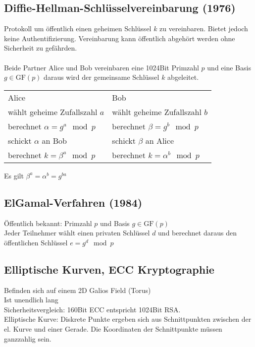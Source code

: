 \documentclass[fs]{latex4ei}
\newcommand{\GF}{\ensuremath{\mathrm{GF}}}									%
\begin{document}
\begin{multicols}{4}
		\subsection{Diffie-Hellman-Schlüsselvereinbarung (1976)}
		Protokoll um öffentlich einen geheimen Schlüssel $k$ zu vereinbaren. Bietet jedoch keine Authentifizierung.
		Vereinbarung kann öffentlich abgehört werden ohne Sicherheit zu gefährden.\\
		\\
		Beide Partner Alice und Bob vereinbaren eine 1024Bit Primzahl $p$ und eine Basis $g \in \GF(p)$ daraus wird der gemeinsame Schlüssel $k$ abgeleitet.\\
		\begin{tabular}{l|l}
			Alice & Bob\\
			wählt geheime Zufallszahl $a$ & wählt geheime Zufallszahl $b$\\
			berechnet $\alpha = g^a \mod p$ & berechnet $\beta = g^b \mod p$\\
			schickt $\alpha$ an Bob & schickt $\beta$ an Alice\\
			berechnet $k = \beta^a \mod p$ & berechnet $k = \alpha^b \mod p$\\
		\end{tabular}
		Es gilt $\beta^a = \alpha^b = g^{ba}$	


		\subsection{ElGamal-Verfahren (1984)}
		Öffentlich bekannt: Primzahl $p$ und Basis $g \in \GF(p)$\\
		Jeder Teilnehmer wählt einen privaten Schlüssel $d$ und berechnet daraus den öffentlichen Schlüssel $e = g^d \mod p$


	\subsection{Elliptische Kurven, ECC Kryptographie}
	Befinden sich auf einem 2D Galios Field (Torus)\\
	Ist unendlich lang\\
	Sicherheitsvergleich: 160Bit ECC entspricht 1024Bit RSA.\\
	Elliptische Kurve: 
	Diskrete Punkte ergeben sich aus Schnittpunkten zwischen der el. Kurve und einer Gerade. Die Koordinaten
	der Schnittpunkte müssen ganzzahlig sein.




\end{multicols}
\end{document}
